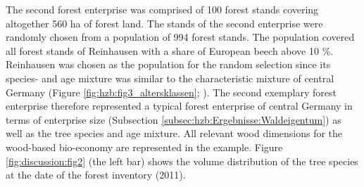 The second forest enterprise was comprised of 100 forest stands covering altogether 560 ha of forest land. The stands of the second enterprise were randomly chosen from a population of 994 forest stands. The population covered all forest stands of Reinhausen with a share of European beech above 10 \%. Reinhausen was chosen as the population for the random selection since its species- and age mixture was similar to the characteristic mixture of central Germany (Figure \ref{fig:hzb:fig3_altersklassen}; \citealp{nlf_2017}). The second exemplary forest enterprise therefore represented a typical forest enterprise of central Germany in terms of enterprise size (Subsection \ref{subsec:hzb:Ergebnisse:Waldeigentum}) as well as the tree species and age mixture. All relevant wood dimensions for the wood-based bio-economy are represented in the example. Figure \ref{fig:discussion:fig2} (the left bar) shows the volume distribution of the tree species at the date of the forest inventory (2011).

